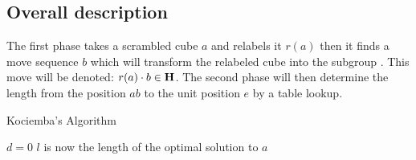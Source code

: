 \begin{figure}[!hbt]
	\centering
	\hspace{0.05\textwidth}
	\caption{}
	\label{fig:relabel2}
\end{figure}

\subsection{Overall description}
\label{sub:overallDescription}
The first phase takes a scrambled cube $a$ and relabels it $r(a)$ then it finds a move sequence $b$ which will transform the relabeled cube into the subgroup . This move will be denoted: $r(a)\cdot{}b \in \textbf{H}$. The second phase will then determine the length from the position $ab$ to the unit position $e$ by a table lookup. 


\begin{algorithm}[!htb]                     
\caption{Kociemba's Algorithm \cite{rokicki09}}          
\label{alg:kociemba}        
\begin{algorithmic}[1]
\STATE $d=0$
			\ENDIF
		\ENDIF
	\ENDFOR
\ENDWHILE
\STATE $l$ is now the length of the optimal solution to $a$
\end{algorithmic}
\end{algorithm}

